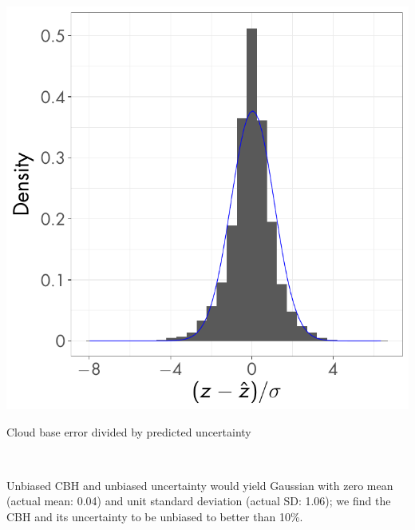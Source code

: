 \documentclass[final,t,12pt]{beamer}\usepackage[]{graphicx}\usepackage[]{color}
\newenvironment{knitrout}{}{} %
\begin{document}
\begin{frame}[fragile]{}
\begin{tcolorbox}
\begin{tcbitemize}[raster equal height=rows, raster columns = 11
      ]
\begin{tcbitemize}[raster columns=1]
\begin{columns}
\begin{column}{0.5\linewidth}
\begin{knitrout}
{\centering \includegraphics[width=\textwidth]{figure/cfmip-cbase-170926-combo-eval-pull-1} 

}



\end{knitrout}
            
            {\small \quad Cloud base error divided by predicted uncertainty}
          \end{column}
        \end{columns}
        ~\\[24pt] Unbiased CBH and unbiased uncertainty would yield Gaussian with
        zero mean (actual mean: 0.04) and unit standard deviation (actual SD:
        1.06); we
        find \alert{the CBH and its uncertainty to be unbiased to better than
          10\%.}

      \end{tcbitemize}
      
      \tcbitem[blankest,space to=\myspace, raster multicolumn = 4]
      \begin{tcbitemize}[raster columns=1]
        \tcbitem[title={Daytime and nighttime CBH distributions}]


\begin{knitrout}
\color{fgcolor}


\end{knitrout}
\end{tcbitemize}
\end{tcbitemize}
\end{tcolorbox}
\end{frame}
\end{document}
